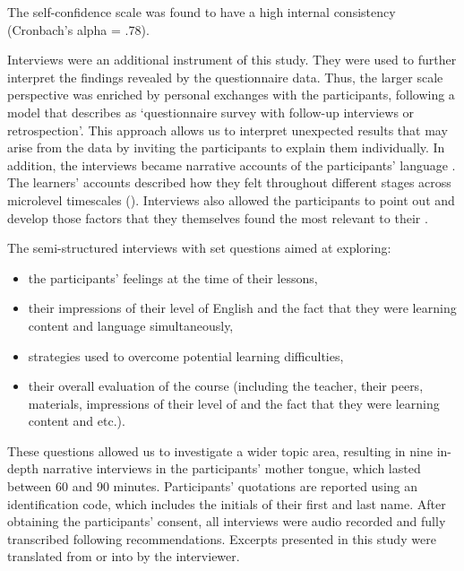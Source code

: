\documentclass[output=paper]{langsci/langscibook}
\begin{document}
The  self-confidence scale was found to have a high internal consistency (Cronbach’s alpha = .78). 



Interviews were an additional instrument of this study. They were used to further interpret the findings revealed by the questionnaire data. Thus, the larger scale perspective was enriched by personal exchanges with the participants, following a model that \citet[170]{Dörnyei2007} describes as ‘questionnaire survey with follow-up interviews or retrospection’. This approach allows us to interpret unexpected results that may arise from the data by inviting the participants to explain them individually. In addition, the interviews became narrative accounts of the participants’ language . The learners’ accounts described how they felt throughout different stages across microlevel timescales (\citealt{MercerWilliams2014}). Interviews also allowed the participants to point out and develop those factors that they themselves found the most relevant to their . 



The semi-structured interviews with set questions aimed at exploring:


\begin{itemize}
\item the participants’ feelings at the time of their lessons,
\item their impressions of their level of English and the fact that they were learning content and language simultaneously,
\item strategies used to overcome potential learning difficulties,
\item their overall evaluation of the course (including the teacher, their peers, materials, impressions of their level of  and the fact that they were learning content and etc.).
\end{itemize}

These questions allowed us to investigate a wider topic area, resulting in nine in-depth narrative interviews in the participants’ mother tongue, which lasted between 60 and 90 minutes. Participants’ quotations are reported using an identification code, which includes the initials of their first and last name. After obtaining the participants’ consent, all interviews were audio recorded and fully transcribed following \cite{Richards2003} recommendations. Excerpts presented in this study were translated from  or  into  by the interviewer.
\end{document}
